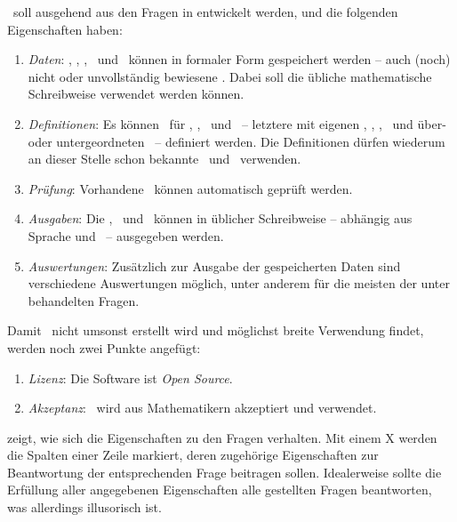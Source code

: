 \ASBA\ soll ausgehend aus den Fragen in  entwickelt werden, und die folgenden Eigenschaften haben:
\begin{enumerate}
	\item \label{Eigenschaft-Daten} \emph{Daten}:
	\Axiome, \Saetze, \Beweise, \Fachbegriffe\ und \Fachgebiete\ können in formaler Form gespeichert werden -- auch (noch) nicht oder unvollständig bewiesene \Saetze.
	Dabei soll die übliche mathematische Schreibweise verwendet werden können.
	\item \label{Eigenschaft-Definitionen} \emph{Definitionen}:
	Es können \Fachbegriffe\ für \Axiome, \Saetze, \Beweise\ und \Fachgebiete\ -- letztere mit eigenen \Axiomen, \Saetzen, \Beweisen, \Fachbegriffen\ und über- oder untergeordneten \Fachgebieten\ -- definiert werden.
	Die Definitionen dürfen wiederum an dieser Stelle schon bekannte \Fachbegriffe\ und \Fachgebiete\ verwenden.
	\item \label{Eigenschaft-Pruefung} \emph{Prüfung}:
	Vorhandene \Beweise\ können automatisch geprüft werden.
	\item \label{Eigenschaft-Ausgaben} \emph{Ausgaben}:
	Die \Axiome, \Saetze\ und \Beweise\ können in üblicher Schreibweise -- abhängig aus Sprache und \Fachgebiet\ -- ausgegeben werden.
	\item \label{Eigenschaft-Auswertungen} \emph{Auswertungen}:
	Zusätzlich zur Ausgabe der gespeicherten Daten sind verschiedene Auswertungen möglich, unter anderem für die meisten der unter  behandelten Fragen.
	\setcounter{Enumi}{\value{enumi}}%
\end{enumerate}
%
Damit \ASBA\ nicht umsonst erstellt wird und möglichst breite Verwendung findet, werden noch zwei Punkte angefügt:
\begin{enumerate}
	\setcounter{enumi}{\value{Enumi}}%
	\item \label{Eigenschaft-Lizenz} \emph{Lizenz}:
	Die Software ist \emph{Open Source}.
	\item \label{Eigenschaft-Akzeptanz} \emph{Akzeptanz}:
	\ASBA\ wird aus Mathematikern akzeptiert und verwendet.
\end{enumerate}
%
 zeigt, wie sich die Eigenschaften zu den Fragen  verhalten.
Mit einem X werden die Spalten einer Zeile markiert, deren zugehörige Eigenschaften zur Beantwortung der entsprechenden Frage beitragen sollen.
Idealerweise sollte die Erfüllung aller angegebenen Eigenschaften alle gestellten Fragen beantworten, was allerdings illusorisch ist.
